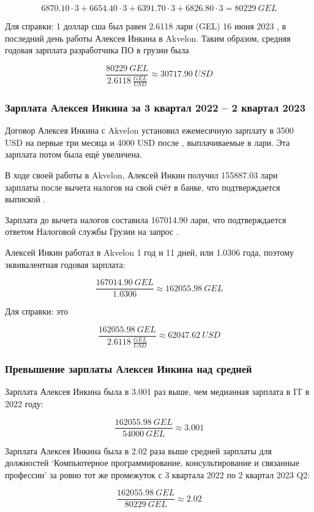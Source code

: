 \[
    6870.10 \cdot 3 + 6654.40 \cdot 3 + 6391.70 \cdot 3 + 6826.80 \cdot 3 = 80229\:GEL
\]

Для справки: 1 доллар сша был равен 2.6118 лари (GEL) 16 июня 2023
,
в последний день работы Алексея Инкина в Akvelon.
Таким образом, средняя годовая зарплата разработчика ПО в грузии была

\[
    \frac{80229\:GEL}{2.6118\:\frac{GEL}{USD}} \approx 30717.90\:USD
\]


\subsubsection{Зарплата Алексея Инкина за 3 квартал 2022 -- 2 квартал 2023}

Договор Алексея Инкина с Akvelon установил ежемесячную зарплату в 3500 USD на первые три месяца
и 4000 USD после , выплачиваемые в лари.
Эта зарплата потом была ещё увеличена.

В ходе своей работы в Akvelon, Алексей Инкин получил 155887.03 лари зарплаты после вычета налогов на свой счёт в банке,
что подтверждается выпиской .

Зарплата до вычета налогов составила 167014.90 лари,
что подтверждается ответом Налоговой службы Грузии на запрос .

Алексей Инкин работал в Akvelon 1 год и 11 дней, или 1.0306 года,
поэтому эквивалентная годовая зарплата:

\[
    \frac{167014.90\:GEL}{1.0306} \approx 162055.98\:GEL
\]

Для справки: это

\[
    \frac{162055.98\:GEL}{2.6118\:\frac{GEL}{USD}} \approx 62047.62\:USD
\]


\subsubsection{Превышение зарплаты Алексея Инкина над средней}


Зарплата Алексея Инкина была в 3.001 раз выше, чем медианная зарплата в IT в 2022 году:

\[
    \frac{162055.98\:GEL}{54000\:GEL} \approx 3.001
\]


Зарплата Алексея Инкина была в 2.02 раза выше средней зарплаты для должностей
`Компьютерное программирование, консультирование и связанные профессии' за ровно тот же промежуток с 3 квартала 2022 по 2 квартал 2023 Q2:

\[
    \frac{162055.98\:GEL}{80229\:GEL} \approx 2.02
\]

\pagebreak
